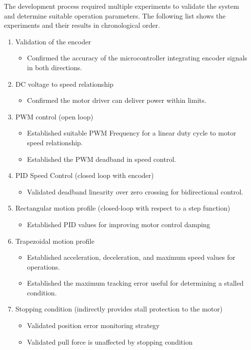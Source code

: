 \begin{itemize}
The development process required multiple experiments to validate the system and determine suitable operation parameters. The following list shows the experiments and their results in chronological order.
\begin{enumerate}
\item Validation of the encoder
    \begin{itemize}
        \item Confirmed the accuracy of the microcontroller integrating encoder signals in both directions.
    \end{itemize}
\item DC voltage to speed relationship
    \begin{itemize}
    \item Confirmed the motor driver can deliver power within limits.
    \end{itemize}
\item PWM control (open loop)
    \begin{itemize}
    \item Established suitable PWM Frequency for a linear duty cycle to motor speed relationship.
    \item Established the PWM deadband in speed control.
    \end{itemize}
\item PID Speed Control (closed loop with encoder)
    \begin{itemize}
\item Validated deadband linearity over zero crossing for bidirectional control.
    \end{itemize}
\item Rectangular motion profile (closed-loop with respect to a step function)
    \begin{itemize}
    \item Established PID values for improving motor control damping
    \end{itemize}
\item Trapezoidal motion profile
    \begin{itemize}
    \item Established acceleration, deceleration, and maximum speed values for operations.
    \item Established the maximum tracking error useful for determining a stalled condition.
    \end{itemize}
\item Stopping condition (indirectly provides stall protection to the motor)
    \begin{itemize}
    \item Validated position error monitoring strategy
    \item Validated pull force is unaffected by stopping condition
\end{itemize}
    \end{enumerate}


\end{itemize}
